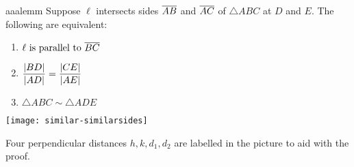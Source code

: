 \goodbreak

\begin{lemm}[lower separated=false, sidebyside, sidebyside align=top seam, sidebyside gap=0pt, righthand width=0.43\linewidth]{}{aaalemm}
	Suppose $\ell$ intersects sides $\overline{AB}$ and $\overline{AC}$ of $\triangle ABC$ at $D$ and $E$. The following are equivalent:
	\begin{enumerate}
	  \item $\ell\text{ is parallel to }\overline{BC}$
	  \item $\displaystyle\frac{\left| BD\right|}{\left| AD\right|}=\frac{\left| CE\right|}{\left| AE\right|}$
	  \item $\triangle ABC\sim\triangle ADE$
	\end{enumerate}
	\tcblower
	\flushright
	\texttt{[image: similar-similarsides]}
\end{lemm}

Four perpendicular distances $h,k,d_1,d_2$ are labelled in the picture to aid with the proof.


